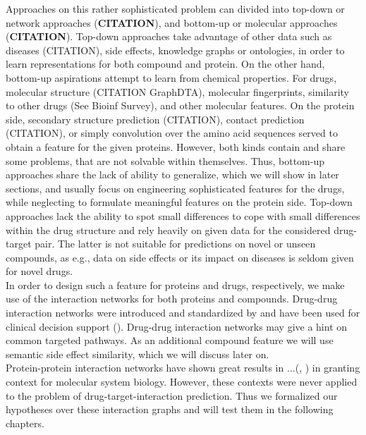 \documentclass{bioinfo}
\begin{document}
Approaches on this rather sophisticated problem can divided into top-down or network approaches (\textbf{CITATION}), and bottom-up or molecular approaches (\textbf{CITATION}). Top-down approaches take advantage of other data such as diseases (CITATION), side effects, knowledge graphs or ontologies, in order to learn representations for both compound and protein. On the other hand, bottom-up aspirations attempt to learn from chemical properties. For drugs, molecular structure (CITATION GraphDTA), molecular fingerprints, similarity to other drugs (See Bioinf Survey), and other molecular features. On the protein side, secondary structure prediction (CITATION), contact prediction (CITATION), or simply convolution over the amino acid sequences served to obtain a feature for the given proteins. However, both kinds contain and share some problems, that are not solvable within themselves. Thus, bottom-up approaches share the lack of ability to generalize, which we will show in later sections, and usually focus on engineering sophisticated features for the drugs, while neglecting to formulate meaningful features on the protein side. Top-down approaches lack the ability to spot small differences to cope with small differences within the drug structure and rely heavily on given data for the considered drug-target pair. The latter is not suitable for predictions on novel or unseen compounds, as e.g., data on side effects or its impact on diseases is seldom given for novel drugs.\\ 
In order to design such a feature for proteins and drugs, respectively, we make use of the interaction networks for both proteins and compounds. Drug-drug interaction networks were introduced and standardized by \cite{Boyce2015} and have been used for clinical decision support (\cite{Scheife2015}). Drug-drug interaction networks may give a hint on common targeted pathways. As an additional compound feature we will use semantic side effect similarity, which we will discuss later on.\\
Protein-protein interaction networks have shown great results in $\dots$(\cite{Vazquez2003}, \cite{Ackerman2019}) in granting context for molecular system biology. However, these contexts were never applied to the problem of drug-target-interaction prediction. Thus we formalized our hypotheses over these interaction graphs and will test them in the following chapters.

\end{document}
